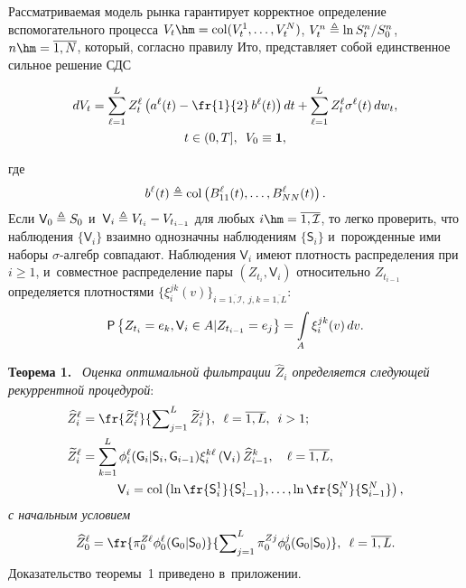 \begin{multicols}{2}
\vspace*{-3pt}


Рассматриваемая модель рынка гарантирует корректное определение вспомогательного 
процесса
$V_t \hm= \col(V_t^1, \ldots,V_t^N)$, $V_t^n \triangleq \ln {S_t^n}/{S_0^n}$, 
$n\hm=\overline{1,N}$, который, согласно правилу Ито, представляет собой 
единственное сильное решение СДС

\vspace*{-6pt}

\noindent
  \begin{multline*}
  dV_t =
  \sum\limits_{\ell=1}^L
  Z_t^{\ell}
  \left( a^{\ell}(t) -\fr{1}{2}\,b^{\ell}(t)
  \right)dt+ \sum\limits_{\ell=1}^L
  Z_t^{\ell} \sigma^{\ell}(t)
  \,dw_t,\\
   t \in (0,T], \enskip V_0 \equiv \mathbf{1},
  \end{multline*}
  
  \noindent
  где 
  $$
  b^{\ell}(t) \triangleq \mathop{\mathrm{col}} \left( B_{11}^{\ell}(t), \ldots, 
B_{NN}^{\ell}(t)\right).
$$
 Если $\mathsf{V}_0 \triangleq S_0$ и~$\mathsf{V}_i \triangleq 
V_{t_i}-V_{t_{i-1}}$ для любых $i \hm=\overline{1,\mathcal{I}}$, то легко 
проверить, что наблюдения $\{\mathsf{V}_i \}$ взаимно однозначны наблюдениям 
$\{\mathsf{S}_i \}$ и~порожденные ими наборы $\sigma$-ал\-гебр совпадают. 
Наблюдения $\mathsf{V}_i$ имеют плот\-ность распределения при $i \geqslant 1$, 
и~совместное распределение пары $(Z_{t_i}, \mathsf{V}_i)$ относительно $Z_{t_{i-1}}$ определяется плотностями 
$\{\xi_i^{jk}(v)\}_{i=\overline{1,\mathcal{I}},\ j,k =\overline{1,L}}$:
  $$
  \mathsf{P}\left\{ Z_{t_i} = e_k, \mathsf{V}_i \in A | Z_{t_{i-1}} = e_j \right\} =\int\limits_A 
\xi_i^{jk}(v)\,dv.
  $$
  
  \smallskip
  
  \noindent
\textbf{Теорема 1.}\ 
\textit{ Оценка оптимальной фильтрации $\widehat{Z}_i$ определяется следующей 
рекуррентной процедурой}:
  \begin{align}
  \widehat{Z}_i^{\ell} &= \fr{\widetilde{Z}_i^{\ell}}{\sum\nolimits_{j=1}^L 
\widetilde{Z}_i^{j}}, \enskip
\ell = \overline{1,L}, \enskip i > 1;
  \label{eq:filt_1}
 \\
     \widetilde{Z}_i^{\ell} &= \sum\limits_{k=1}^L
  \phi_i^{\ell}(\mathsf{G}_i | \mathsf{S}_i ,\mathsf{G}_{i-1} )
  \xi_i^{k\ell}\left(\mathsf{V}_{i} \right) \widehat{Z}_{i-1}^{k}, \quad
\ell = \overline{1,L}, \notag\\
&\hspace*{10mm} \mathsf{V}_{i} = \col \left(\ln 
\fr{\mathsf{S}_i^1}{\mathsf{S}_{i-1}^1},
\ldots, \ln \fr{\mathsf{S}_i^N}{\mathsf{S}_{i-1}^N}
 \right),
  \label{eq:filt_2}
  \end{align}
  \textit{с начальным условием}
    \begin{equation}
  \widehat{Z}_0^{\ell} = \fr{\pi_0^{Z\ell} \phi_0^{\ell}(\mathsf{G}_0 | 
\mathsf{S}_0)}{\sum\nolimits_{j=1}^L \pi_0^{Z j} \phi_0^{j}(\mathsf{G}_0 | \mathsf{S}_0) 
}, \enskip
\ell = \overline{1,L}.
  \label{eq:filt_3}
  \end{equation}
Доказательство теоремы~1 приведено в~приложении.


\end{multicols}
